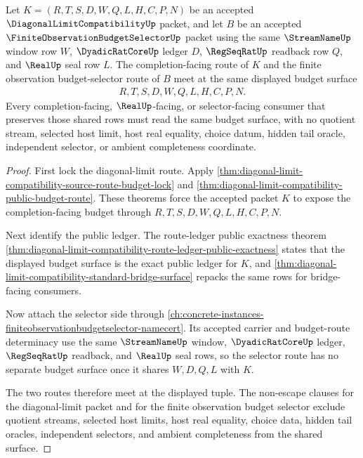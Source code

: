 \begin{theorem}
\label{thm:diagonal-limit-compatibility-budget-selector-route-meet}
Let $K=(R,T,S,D,W,Q,L,H,C,P,N)$ be an accepted $\DiagonalLimitCompatibilityUp$ packet, and let $B$ be an accepted $\FiniteObservationBudgetSelectorUp$ packet using the same $\StreamNameUp$ window row $W$, $\DyadicRatCoreUp$ ledger $D$, $\RegSeqRatUp$ readback row $Q$, and $\RealUp$ seal row $L$. The completion-facing route of $K$ and the finite observation budget-selector route of $B$ meet at the same displayed budget surface
$$
\begin{aligned}
  R,T,S,D,W,Q,L,H,C,P,N .
\end{aligned}
$$
Every completion-facing, $\RealUp$-facing, or selector-facing consumer that preserves those shared rows must read the same budget surface, with no quotient stream, selected host limit, host real equality, choice datum, hidden tail oracle, independent selector, or ambient completeness coordinate.
\end{theorem}
\begin{proof}
First lock the diagonal-limit route. Apply \autoref{thm:diagonal-limit-compatibility-source-route-budget-lock} and \autoref{thm:diagonal-limit-compatibility-public-budget-route}. These theorems force the accepted packet $K$ to expose the completion-facing budget through $R,T,S,D,W,Q,L,H,C,P,N$.

Next identify the public ledger. The route-ledger public exactness theorem \autoref{thm:diagonal-limit-compatibility-route-ledger-public-exactness} states that the displayed budget surface is the exact public ledger for $K$, and \autoref{thm:diagonal-limit-compatibility-standard-bridge-surface} repacks the same rows for bridge-facing consumers.

Now attach the selector side through \autoref{ch:concrete-instances-finiteobservationbudgetselector-namecert}. Its accepted carrier and budget-route determinacy use the same $\StreamNameUp$ window, $\DyadicRatCoreUp$ ledger, $\RegSeqRatUp$ readback, and $\RealUp$ seal rows, so the selector route has no separate budget surface once it shares $W,D,Q,L$ with $K$.

The two routes therefore meet at the displayed tuple. The non-escape clauses for the diagonal-limit packet and for the finite observation budget selector exclude quotient streams, selected host limits, host real equality, choice data, hidden tail oracles, independent selectors, and ambient completeness from the shared surface.
\end{proof}

